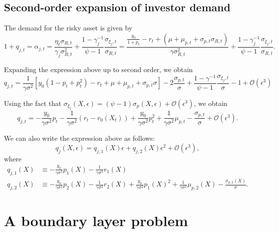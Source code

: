 \documentclass[11pt,english]{article}
\begin{document}
\subsection{Second-order expansion of investor demand }

The demand for the risky asset is given by 
\begin{equation}
    1+q_{j,t} = \alpha_{j,t} = \frac{\eta_t \sigma_{R,t}}{\gamma_j \sigma_{R,t}^2} + \frac{1-\gamma_j^{-1}}{\psi-1} \frac{\sigma_{\xi_j,t}}{\sigma_{R,t}} = \frac{\frac{y_0}{1+p_t} - r_t + (\mu + \mu_{p,t}+\sigma_{p,t}\sigma_{R,t})}{\gamma \sigma_{R,t}^2} + \frac{1-\gamma_j^{-1}}{\psi-1} \frac{\sigma_{\xi_j,t}}{\sigma_{R,t}}.
\end{equation}

Expanding the expression above up to second order, we obtain
\begin{equation}
    q_{j,t} = \frac{1}{\gamma \sigma^2}\left[ y_0 ( 1- p_t+p_t^2) - r_t +\mu+ \mu_{p,t} + \sigma_{p,t} \sigma  \right] - 2 \frac{\sigma_{p,t}}{\sigma}+ \frac{1-\gamma^{-1}}{\psi-1} \frac{\sigma_{\xi_j,t}}{\sigma} - 1 + \mathcal{O}(\epsilon^3)
\end{equation}

Using the fact that $\sigma_{\xi_j}(X,\epsilon) = (\psi-1) \sigma_{p}(X,\epsilon) + \mathcal{O}(\epsilon^3)$, we obtain
\begin{equation}
    q_{j,t} = -\frac{y_0}{\gamma \sigma^2} p_t - \frac{1}{\gamma \sigma^2} (r_t-r_0(X_t)) + \frac{y_0}{\gamma \sigma^2} p_t^2 + \frac{1}{\gamma \sigma^2}\mu_{p,t} -  \frac{\sigma_{p,t}}{\sigma} + \mathcal{O}(\epsilon^3).
\end{equation}

We can also write the expression above as follows:
\begin{equation}
    q_{j}(X,\epsilon) = q_{j,1}(X) \epsilon + q_{j,2}(X)\epsilon^2 + \mathcal{O}(\epsilon^3),
\end{equation}
where
\begin{align}
    q_{j,1}(X) &\equiv -\frac{y_0}{\gamma \sigma^2} p_{1}(X) - \frac{1}{\gamma \sigma^2} r_1(X) \nonumber\\
    q_{j,2}(X) &\equiv -\frac{y_0}{\gamma \sigma^2} p_{2}(X) - \frac{1}{\gamma \sigma^2} r_2(X)  + \frac{y_0}{\gamma \sigma^2} p_1(X)^2 + \frac{1}{\gamma \sigma^2} \mu_{p,2}(X) - \frac{\sigma_{p,2}(X)}{\sigma}.
\end{align}

\newpage

\section{A boundary layer problem}
\end{document}
